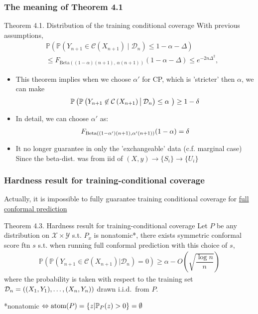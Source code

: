 \documentclass[compress]{beamer}
\begin{document}
\begin{frame}\frametitle{The meaning of Theorem 4.1}
	\begin{block}{Theorem 4.1. Distribution of the training conditional coverage}
		With previous assumptions,
		\begin{align*}
			&\mathbb{P}\left( 
			\mathbb{P}(Y_{n+1} \in \mathcal{C}(X_{n+1}) \mid \mathcal{D}_n) 
			\leq 1 - \alpha - \Delta 
			\right) 
			\\&\leq F_{\text{Beta}((1-\alpha)(n+1),\, \alpha(n+1))}(1 - \alpha - \Delta) 
			\leq e^{-2n\Delta^2},
		\end{align*}
	\end{block}
	\begin{itemize}
		\item This theorem implies when we choose $\alpha'$ for CP, which is 'stricter' then $\alpha$, we can make
		\begin{align*}
			\P\left(\P\left(Y_{n+1} \not\in \cC\left(X_{n+1}\right) \big| \: \cD_n\right)\le \alpha \ \right) \ge 1- \delta
		\end{align*}
		\item In detail, we can choose $\alpha'$ as:
		\begin{align*}
			F_{\textnormal{Beta}((1-\alpha')(n+1),\alpha'(n+1))}(1-\alpha)  = \delta
		\end{align*}
		\item It no longer guarantee in only the 'exchangeable' data (c.f. marginal case) \\Since the beta-dist. was from iid of $(X, y) \rightarrow \{S_i\} \rightarrow \{U_i\} $ 
	\end{itemize}
\end{frame}



\begin{frame}\frametitle{Hardness result for training-conditional coverage}
	Actually, it is impossible to fully guarantee training
	conditional coverage for \underline{full conformal prediction}
	\begin{block}{Theorem 4.3. Hardness result for training-conditional coverage}
		Let $P$ be any distribution on $\mathcal{X\times Y}$ s.t. $P_x$ is nonatomic*, there exists symmetric conformal score ftn $s$ s.t. when running full conformal prediction with this choice
 of $s$,
		\begin{align*}
			\mathbb{P}\left(\mathbb{P}(Y_{n+1}\in \mathcal{C}(X_{n+1})|\mathcal{D}_n) = 0\right)\ge \alpha - O\left(\sqrt{\dfrac{\log n}{n}}\right)
		\end{align*}
		where the probability is taken with respect to the training set $\cD_n=((X_1,Y_1),\dots,(X_n,Y_n))$ drawn i.i.d.\ from $P$.
	\end{block}
	*nonatomic $\Leftrightarrow \text{atom}(P) = \{z|\P_{P}(z)>0\} = \emptyset$
\end{frame}
\end{document}
